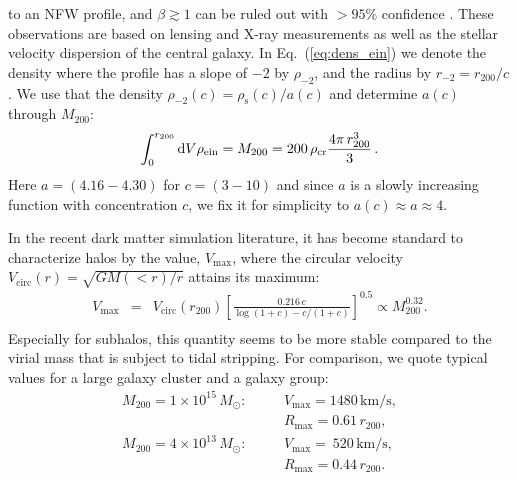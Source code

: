 \documentclass[10pt,aps,pra,reprint,amsmath,amsfonts,amssymb,showpacs,nofootinbib,floatfix]{revtex4-1}
\newcommand{\rmn}{\mathrm}
\newcommand{\msun}{M_\odot}
\newcommand{\s}{\rmn{s}}
\newcommand{\dd}{\rmn{d}}
\newcommand{\rvir}{r_{200}}
\newcommand{\mvir}{M_{200}}
\begin{document}
to an NFW profile, and $\beta\gtrsim 1$ can be ruled out with $>95$\%
confidence \cite{2011ApJ...728L..39N}. These observations are based on
lensing and X-ray measurements as well as the stellar velocity
dispersion of the central galaxy. In Eq.~(\ref{eq:dens_ein}) we denote
the density where the profile has a slope of $-2$ by $\rho_{-2}$, and
the radius by $r_{-2}=\rvir/c$. We use that the density
$\rho_{-2}(c)=\rho_\s(c)/a(c)$ and determine $a(c)$ through $\mvir$:
\begin{equation}
\int_0^{\rvir}\dd V \rho_{\rm ein} = \mvir =
200\,\rho_{\rmn{cr}} \frac{4\pi\,\rvir^3}{3} \,.
\end{equation}
Here $a=(4.16-4.30)$ for $c=(3-10)$ and since $a$ is a slowly
increasing function with concentration $c$, we fix it for simplicity
to $a(c)\approx a \approx 4$.

In the recent dark matter simulation literature, it has become
standard to characterize halos by the value, $V_\rmn{max}$, where the
circular velocity $V_\rmn{circ}(r)=\sqrt{GM(<r)/r}$ attains its
maximum:
\begin{eqnarray}
V_\rmn{max} &=& V_\rmn{circ}(\rvir)
\left[\frac{0.216\,c}{\log(1+c)-c/(1+c)}\right]^{0.5}\propto \mvir^{0.32}.\nonumber\\
\end{eqnarray}
Especially for subhalos, this quantity seems to be more stable
compared to the virial mass that is subject to tidal stripping. For
comparison, we quote typical values for a large galaxy cluster and a galaxy group:
\begin{eqnarray}
M_{200} = 1\times10^{15}\,\msun:\quad &&V_\rmn{max}=1480\,\rmn{km/s}, \nonumber\\
                                     &&R_\rmn{max}=0.61\,\rvir, \\
M_{200} = 4\times10^{13}\,\msun:\quad &&V_\rmn{max}=~520\,\rmn{km/s}, \nonumber\\
                                     &&R_\rmn{max}=0.44\,\rvir.
\end{eqnarray}
\end{document}
